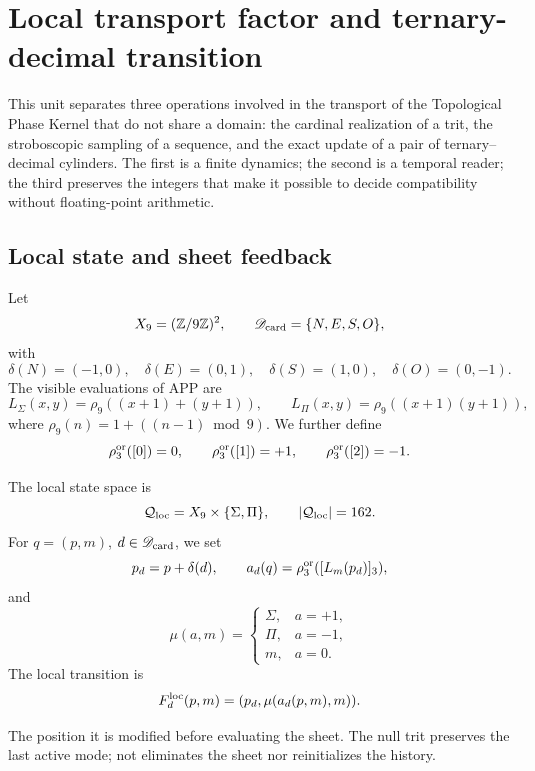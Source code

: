{%

\section{Local transport factor and ternary-decimal transition}
\label{p12-83-c1-s8:chap:tpk-factor-local-transicion-cilindros}

This unit separates three operations involved in the transport of the
Topological Phase Kernel that do not share a domain: the cardinal realization
of a trit, the stroboscopic sampling of a sequence, and the exact update
of a pair of ternary--decimal cylinders. The first is a finite
dynamics; the second is a temporal reader; the third preserves the integers
that make it possible to decide compatibility without floating-point arithmetic.

\subsection{Local state and sheet feedback}

Let
\[
 X_9=(\mathbb Z/9\mathbb Z)^2,
 \qquad
 \mathscr D_{\rm card}=\{N,E,S,O\},
\]
with
\[
 \delta(N)=(-1,0),\quad \delta(E)=(0,1),\quad
 \delta(S)=(1,0),\quad \delta(O)=(0,-1).
\]
The visible evaluations of APP are
\[
 L_\Sigma(x,y)=\rho_9((x+1)+(y+1)),
 \qquad
 L_\Pi(x,y)=\rho_9((x+1)(y+1)),
\]
where \(\rho_9(n)=1+((n-1)\bmod9)\). We further define
\[
 \rho_3^{\rm or}([0])=0,
 \qquad
 \rho_3^{\rm or}([1])=+1,
 \qquad
 \rho_3^{\rm or}([2])=-1.
\]

\begin{definition}
\label{p12-83-c1-s8:def:u006a-factor-local}
The local state space is
\[
 \mathcal Q_{\rm loc}=X_9\times\{\Sigma,\Pi\},
 \qquad |\mathcal Q_{\rm loc}|=162.
\]
For \(q=(p,m)\), \(d\in\mathscr D_{\rm card}\), we set
\[
 p_d=p+\delta(d),
 \qquad
 a_d(q)=\rho_3^{\rm or}([L_m(p_d)]_3),
\]
and
\[
 \mu(a,m)=
 \begin{cases}
  \Sigma,&a=+1,\\
  \Pi,&a=-1,\\
  m,&a=0.
 \end{cases}
\]
The local transition is
\[
 F_d^{\rm loc}(p,m)=(p_d,\mu(a_d(p,m),m)).
\]
\end{definition}

The position it is modified before evaluating the sheet. The null trit preserves the
last active mode; not eliminates the sheet nor reinitializes the history.

}

